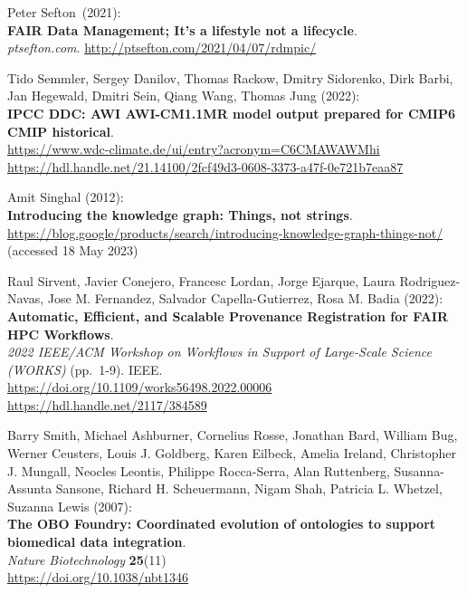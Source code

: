 \begin{thebibliography}{9}
Peter Sefton~(2021):\\
\textbf{FAIR Data Management; It's a lifestyle not a lifecycle}.\\
\emph{ptsefton.com}. \url{http://ptsefton.com/2021/04/07/rdmpic/}

Tido Semmler, Sergey Danilov, Thomas Rackow, Dmitry Sidorenko, Dirk
Barbi, Jan Hegewald, Dmitri Sein, Qiang Wang, Thomas Jung (2022):\\
\textbf{IPCC DDC: AWI AWI-CM1.1MR model output prepared for CMIP6 CMIP
historical}. \\
\url{https://www.wdc-climate.de/ui/entry?acronym=C6CMAWAWMhi}\\
\url{https://hdl.handle.net/21.14100/2fcf49d3-0608-3373-a47f-0e721b7eaa87}

Amit Singhal (2012): \\
\textbf{Introducing the knowledge graph: Things, not strings}.\\
\url{https://blog.google/products/search/introducing-knowledge-graph-things-not/}
(accessed 18 May 2023)

Raul Sirvent, Javier Conejero, Francesc Lordan, Jorge Ejarque, Laura Rodriguez-Navas, Jose M. Fernandez, Salvador Capella-Gutierrez, Rosa M. Badia (2022):\\
\textbf{Automatic, Efficient, and Scalable Provenance Registration for
FAIR HPC Workflows}.\\
\emph{2022 IEEE/ACM Workshop on Workflows in Support of Large-Scale Science (WORKS)} (pp.~1-9). IEEE.\\
\url{https://doi.org/10.1109/works56498.2022.00006}\\
\url{https://hdl.handle.net/2117/384589}

Barry Smith, Michael Ashburner, Cornelius Rosse, Jonathan Bard, William
Bug, Werner Ceusters, Louis J. Goldberg, Karen Eilbeck, Amelia Ireland,
Christopher J. Mungall, Neocles Leontis, Philippe Rocca-Serra, Alan
Ruttenberg, Susanna-Assunta Sansone, Richard H. Scheuermann, Nigam Shah,
Patricia L. Whetzel, Suzanna Lewis (2007): \\
\textbf{The {OBO Foundry}:
Coordinated evolution of ontologies to support biomedical data
integration}. \\
\emph{Nature Biotechnology} \textbf{25}(11) \\
\url{https://doi.org/10.1038/nbt1346}


\end{thebibliography}
